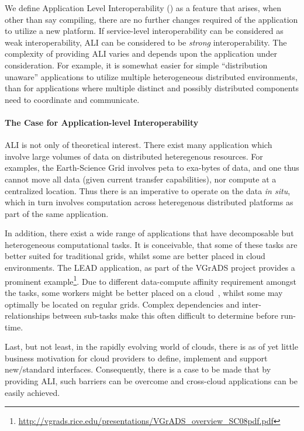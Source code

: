 \documentclass[3p,twocolumn]{elsarticle}
\begin{document}
We define Application Level Interoperability () as a feature
that arises, when other than say compiling, there
are no further changes required of the application to utilize a new
platform.  If service-level interoperability can be considered as weak
interoperability, ALI can be considered to be {\it strong}
interoperability.
The complexity of providing ALI varies and depends upon the
application under consideration.  For example, it is somewhat easier
for simple ``distribution unaware'' applications to utilize multiple
heterogeneous distributed environments, than for applications where
multiple distinct and possibly distributed components need to
coordinate and communicate.


\paragraph{The Case for Application-level Interoperability}

ALI is not only of theoretical interest. There exist many application
which involve large volumes of data on distributed heteregenous
resources. For examples, the Earth-Science Grid involves peta to
exa-bytes of data, and one thus cannot move all data (given
current transfer capabilities), nor compute at a centralized location.
Thus there is an imperative to operate on the data {\it in situ},
which in turn involves computation across heteregenous distributed
platforms as part of the same application.

In addition, there exist a wide range of applications that have
decomposable but heterogeneous computational tasks. It is conceivable,
that some of these tasks are better suited for traditional grids,
whilst some are better placed in cloud environments.  The LEAD
application, as part of the VGrADS project provides a prominent
example\footnote{\url{http://vgrads.rice.edu/presentations/VGrADS_overview_SC08pdf.pdf}}.
Due to different data-compute affinity requirement amongst the tasks,
some workers might be better placed on a cloud~\cite{jha_ccpe09},
whilst some may optimally be located on regular grids. Complex
dependencies and inter-relationships between sub-tasks make this often
difficult to determine before run-time.

Last, but not least, in the rapidly evolving world of clouds, there is
as of yet little business motivation for cloud providers to define,
implement and support new/standard interfaces. Consequently, there is
a case to be made that by providing ALI, such barriers can be overcome
and cross-cloud applications can be easily achieved.
\end{document}

